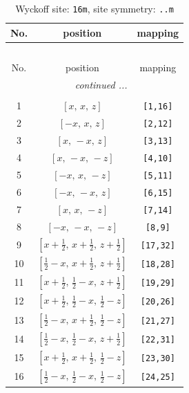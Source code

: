 \documentclass[fleqn,8pt]{jsarticle}
\begin{document}
\renewcommand{\arraystretch}{1.2}
\begin{longtable}{ccc}
\caption{Wyckoff site: {\tt 16m}, site symmetry: {\tt ..m}}
 \\
 \hline \hline
No. & position & mapping \\ \hline \endfirsthead

\multicolumn{2}{l}{\tablename\ \thetable{}} \\
 \hline \hline
No. & position & mapping \\ \hline \endhead

 \hline \hline
\multicolumn{2}{r}{\footnotesize\it continued ...} \\ \endfoot

 \hline \hline
\multicolumn{2}{r}{} \\ \endlastfoot

1 & $\left[ x,\, x,\, z \right]$ & {\tt [1,16]} \\ \hline
2 & $\left[ - x,\, x,\, z \right]$ & {\tt [2,12]} \\ \hline
3 & $\left[ x,\, - x,\, z \right]$ & {\tt [3,13]} \\ \hline
4 & $\left[ x,\, - x,\, - z \right]$ & {\tt [4,10]} \\ \hline
5 & $\left[ - x,\, x,\, - z \right]$ & {\tt [5,11]} \\ \hline
6 & $\left[ - x,\, - x,\, z \right]$ & {\tt [6,15]} \\ \hline
7 & $\left[ x,\, x,\, - z \right]$ & {\tt [7,14]} \\ \hline
8 & $\left[ - x,\, - x,\, - z \right]$ & {\tt [8,9]} \\ \hline
9 & $\left[ x + \frac{1}{2},\, x + \frac{1}{2},\, z + \frac{1}{2} \right]$ & {\tt [17,32]} \\ \hline
10 & $\left[ \frac{1}{2} - x,\, x + \frac{1}{2},\, z + \frac{1}{2} \right]$ & {\tt [18,28]} \\ \hline
11 & $\left[ x + \frac{1}{2},\, \frac{1}{2} - x,\, z + \frac{1}{2} \right]$ & {\tt [19,29]} \\ \hline
12 & $\left[ x + \frac{1}{2},\, \frac{1}{2} - x,\, \frac{1}{2} - z \right]$ & {\tt [20,26]} \\ \hline
13 & $\left[ \frac{1}{2} - x,\, x + \frac{1}{2},\, \frac{1}{2} - z \right]$ & {\tt [21,27]} \\ \hline
14 & $\left[ \frac{1}{2} - x,\, \frac{1}{2} - x,\, z + \frac{1}{2} \right]$ & {\tt [22,31]} \\ \hline
15 & $\left[ x + \frac{1}{2},\, x + \frac{1}{2},\, \frac{1}{2} - z \right]$ & {\tt [23,30]} \\ \hline
16 & $\left[ \frac{1}{2} - x,\, \frac{1}{2} - x,\, \frac{1}{2} - z \right]$ & {\tt [24,25]} \\
\end{longtable}
\end{document}
